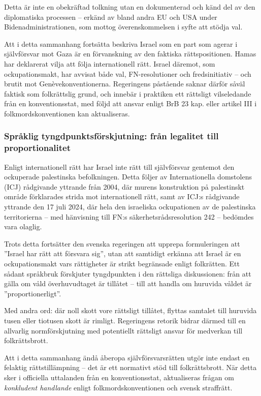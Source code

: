 Detta är inte en obekräftad tolkning utan en dokumenterad och känd del av den diplomatiska processen – erkänd av 
bland andra EU och USA under Bidenadministrationen, som mottog överenskommelsen i syfte att stödja val.

Att i detta sammanhang fortsätta beskriva Israel som en part som agerar i självförsvar mot Gaza är en förvanskning 
av den faktiska rättspositionen. Hamas har deklarerat vilja att följa internationell rätt. Israel däremot, som ockupationsmakt, 
har avvisat både val, FN-resolutioner och fredsinitiativ – och brutit mot Genèvekonventionerna. 
Regeringens påstående saknar därför såväl faktisk som folkrättslig grund, och innebär i praktiken ett rättsligt vilseledande 
från en konventionsstat, med följd att ansvar enligt BrB 23 kap. eller artikel III i folkmordskonventionen 
kan aktualiseras.

\medskip

\subsubsection{Språklig tyngdpunktsförskjutning: från legalitet till proportionalitet}

Enligt internationell rätt har Israel inte rätt till självförsvar gentemot den ockuperade palestinska befolkningen. 
Detta följer av Internationella domstolens (ICJ) rådgivande yttrande från 2004, där murens konstruktion på palestinskt område 
förklarades strida mot internationell rätt, samt av ICJ:s rådgivande yttrande den 17 juli 2024, där hela den israeliska 
ockupationen av de palestinska territorierna – med hänvisning till FN:s säkerhetsrådsresolution 242 – bedömdes vara olaglig. 

Trots detta fortsätter den svenska regeringen att upprepa formuleringen att ”Israel har rätt att försvara sig”, 
utan att samtidigt erkänna att Israel är en ockupationsmakt vars rättigheter är strikt begränsade enligt folkrätten. 
Ett sådant språkbruk förskjuter tyngdpunkten i den rättsliga diskussionen: 
från att gälla om våld överhuvudtaget är tillåtet – till att handla om huruvida våldet är ”proportionerligt”.

Med andra ord: där noll skott vore rättsligt tillåtet, flyttas samtalet till huruvida tusen eller tiotusen skott är rimligt. 
Regeringens retorik bidrar därmed till en allvarlig normförskjutning med potentiellt rättsligt ansvar för medverkan 
till folkrättsbrott. 

Att i detta sammanhang ändå åberopa självförsvarsrätten utgör inte endast en felaktig rättstillämpning – det är ett 
normativt stöd till folkrättsbrott. 
När detta sker i officiella uttalanden från en konventionsstat, aktualiseras frågan om \textit{konkludent handlande} 
enligt folkmordskonventionen och svensk straffrätt.


